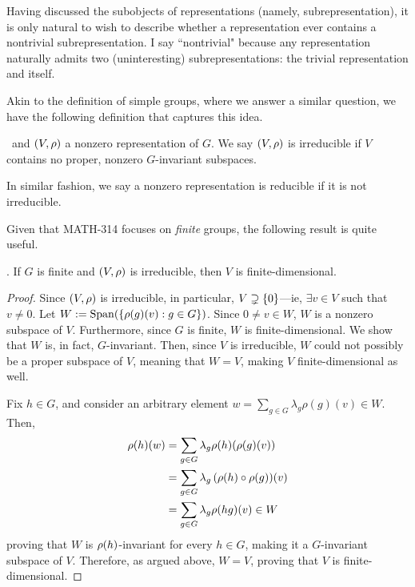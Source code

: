 Having discussed the subobjects of representations (namely, subrepresentation), it is only natural to wish to describe whether a representation ever contains a nontrivial subrepresentation. I say ``nontrivial" because any representation naturally admits two (uninteresting) subrepresentations: the trivial representation and itself.

Akin to the definition of simple groups, where we answer a similar question, we have the following definition that captures this idea.

\begin{boxdefinition}[Irreducibility]
    \ and $\left( V, \rho \right)$ a nonzero representation of $G$. We say $\left( V,\rho \right)$ is irreducible if $V$ contains no proper, nonzero $G$-invariant subspaces.
\end{boxdefinition}
In similar fashion, we say a nonzero representation is reducible if it is not irreducible.

Given that MATH-314 focuses on \textit{finite} groups, the following result is quite useful.

\begin{proposition}
    . If $G$ is finite and $\left( V,\rho \right)$ is irreducible, then $V$ is finite-dimensional.
\end{proposition}
\begin{proof}
    Since $\left( V, \rho \right)$ is irreducible, in particular, $V \supsetneq \left\{ 0 \right\}$---ie, $\exists v \in V$ such that $v \neq 0$. Let $W := \operatorname{Span}\!\left( \left\{ \rho\!\left( g \right)\!(v) : g \in G \right\} \right)$. Since $0 \neq v \in W$, $W$ is a nonzero subspace of $V$. Furthermore, since $G$ is finite, $W$ is finite-dimensional. We show that $W$ is, in fact, $G$-invariant. Then, since $V$ is irreducible, $W$ could not possibly be a proper subspace of $V$, meaning that $W = V$, making $V$ finite-dimensional as well.

    Fix $h \in G$, and consider an arbitrary element $w = \sum_{g \in G} \lambda_g \rho(g)(v) \in W$. Then,
    \begin{align*}
        \rho(h)(w) &= \sum_{g \in G} \lambda_g \rho(h)\!\left( \rho(g)(v) \right) \\
        &= \sum_{g \in G} \lambda_g \left( \rho(h) \circ \rho(g) \right)\!(v) \\
        &= \sum_{g \in G} \lambda_g \rho\!\left( hg \right)\!(v) \in W
    \end{align*}
    proving that $W$ is $\rho\!\left( h \right)$-invariant for every $h \in G$, making it a $G$-invariant subspace of $V$. Therefore, as argued above, $W = V$, proving that $V$ is finite-dimensional.
\end{proof}

